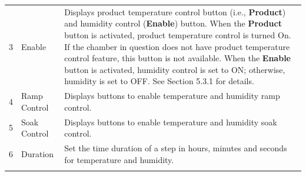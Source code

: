 \begin{longtable}[]{@{}|l|l|l|@{}}
\begin{minipage}[t]{0.04\columnwidth}
3\strut
\end{minipage} & \begin{minipage}[t]{0.23\columnwidth}\raggedright
Enable\strut
\end{minipage} & \begin{minipage}[t]{0.65\columnwidth}\raggedright
Displays product temperature control button (i.e., \textbf{Product}) and
humidity control (\textbf{Enable}) button. When the \textbf{Product}
button is activated, product temperature control is turned On. If the
chamber in question does not have product temperature control feature,
this button is not available. When the \textbf{Enable} button is
activated, humidity control is set to ON; otherwise, humidity is set to
OFF. See Section 5.3.1 for details.\strut
\end{minipage}\tabularnewline
\begin{minipage}[t]{0.04\columnwidth}\raggedright
4\strut
\end{minipage} & \begin{minipage}[t]{0.23\columnwidth}\raggedright
Ramp Control\strut
\end{minipage} & \begin{minipage}[t]{0.65\columnwidth}\raggedright
Displays buttons to enable temperature and humidity ramp control.\strut
\end{minipage}\tabularnewline
\begin{minipage}[t]{0.04\columnwidth}\raggedright
5\strut
\end{minipage} & \begin{minipage}[t]{0.23\columnwidth}\raggedright
Soak Control\strut
\end{minipage} & \begin{minipage}[t]{0.65\columnwidth}\raggedright
Displays buttons to enable temperature and humidity soak control.\strut
\end{minipage}\tabularnewline
\begin{minipage}[t]{0.04\columnwidth}\raggedright
6\strut
\end{minipage} & \begin{minipage}[t]{0.23\columnwidth}\raggedright
Duration\strut
\end{minipage} & \begin{minipage}[t]{0.65\columnwidth}\raggedright
Set the time duration of a step in hours, minutes and seconds for
temperature and humidity.\strut
\end{minipage}\tabularnewline
\begin{minipage}[t]{0.04\columnwidth}\raggedright

\end{minipage}
\end{longtable}
